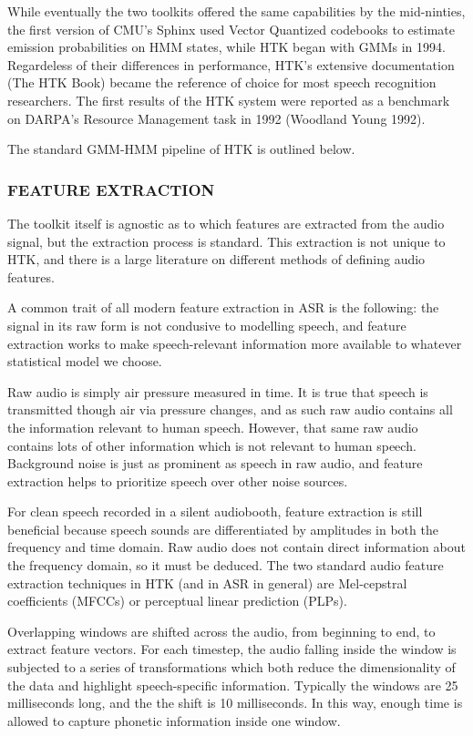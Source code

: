 \documentclass[10pt,a4paper]{article}
\begin{document}
While eventually the two toolkits offered the same capabilities by the mid-ninties, the first version of CMU's Sphinx used Vector Quantized codebooks to estimate emission probabilities on HMM states, while HTK began with GMMs in 1994. Regardeless of their differences in performance, HTK's extensive documentation (The HTK Book) became the reference of choice for most speech recognition researchers. The first results of the HTK system were reported as a benchmark on DARPA's Resource Management task in 1992 (Woodland Young 1992).

The standard GMM-HMM pipeline of HTK is outlined below. 

\subsubsection*{FEATURE EXTRACTION}

  The toolkit itself is agnostic as to which features are extracted from the audio signal, but the extraction process is standard. This extraction is not unique to HTK, and there is a large literature on different methods of defining audio features.
  
  A common trait of all modern feature extraction in ASR is the following: the signal in its raw form is not condusive to modelling speech, and feature extraction works to make speech-relevant information more available to whatever statistical model we choose.

  Raw audio is simply air pressure measured in time. It is true that speech is transmitted though air via pressure changes, and as such raw audio contains all the information relevant to human speech. However, that same raw audio contains lots of other information which is not relevant to human speech. Background noise is just as prominent as speech in raw audio, and feature extraction helps to prioritize speech over other noise sources.

  For clean speech recorded in a silent audiobooth, feature extraction is still beneficial because speech sounds are differentiated by amplitudes in both the frequency and time domain. Raw audio does not contain direct information about the frequency domain, so it must be deduced.
  The two standard audio feature extraction techniques in HTK (and in ASR in general) are Mel-cepstral coefficients (MFCCs) or perceptual linear prediction (PLPs).

  Overlapping windows are shifted across the audio, from beginning to end, to extract feature vectors. For each timestep, the audio falling inside the window is subjected to a series of transformations which both reduce the dimensionality of the data and highlight speech-specific information. Typically the windows are 25 milliseconds long, and the the shift is 10 milliseconds. In this way, enough time is allowed to capture phonetic information inside one window.
\end{document}
